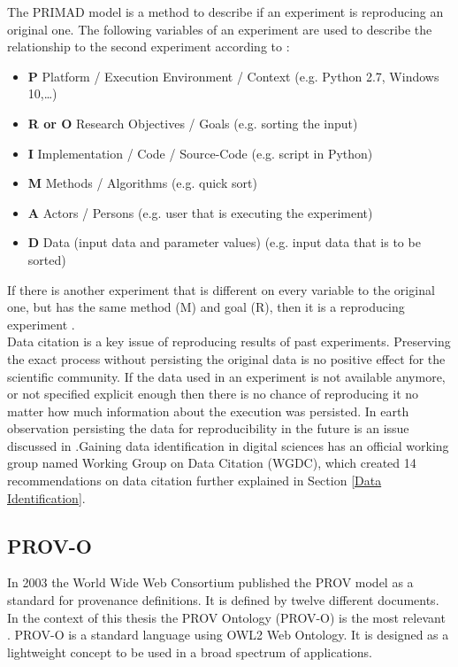 \documentclass[draft,final]{vutinfth} %
\begin{document}
The PRIMAD model is a method to describe if an experiment is reproducing an original one. The following variables of an experiment are used to describe the relationship to the second experiment according to \cite{primad}:

\begin{itemize}
	\item \textbf{P} Platform / Execution Environment / Context (e.g. Python 2.7, Windows 10,\dots) \\
	\item \textbf{R or O} Research Objectives / Goals (e.g. sorting the input) \\
	\item \textbf{I} Implementation / Code / Source-Code (e.g. script in Python) \\
	\item \textbf{M} Methods / Algorithms (e.g. quick sort) \\
	\item \textbf{A} Actors / Persons (e.g. user that is executing the experiment) \\
	\item \textbf{D} Data (input data and parameter values)   (e.g. input data that is to be sorted) 
\end{itemize}
If there is another experiment that is different on every variable to the original one, but has the same method (M) and goal (R), then it is a reproducing experiment \cite{primad}. 
\\  
Data citation is a key issue of reproducing results of past experiments. Preserving the exact process without persisting the original data is no positive effect for the scientific community. If the data used in an experiment is not available anymore, or not specified explicit enough then there is no chance of reproducing it no matter how much information about the execution was persisted. In earth observation persisting the data for reproducibility in the future is an issue discussed in \cite{6352411}.Gaining data identification in digital sciences has an official working group named Working Group on Data Citation (WGDC), which created 14 recommendations on data citation further explained in Section \ref{Data Identification}.

 \subsection{PROV-O}\label{PROV}
In 2003 the World Wide Web Consortium published the PROV model as a standard for provenance definitions. It is defined by twelve different documents. In the context of this thesis the PROV Ontology (PROV-O) is the most relevant \cite{f06eee9045b445be89cf07100b3ce05c}. 
PROV-O is a standard language using OWL2 Web Ontology. It is designed as a lightweight concept to be used in a broad spectrum of applications. 
\end{document}
